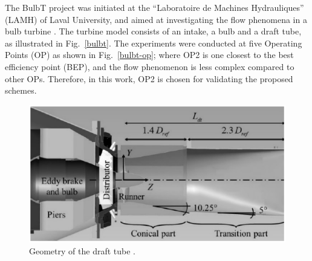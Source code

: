 The BulbT project was initiated at the ``Laboratoire de Machines Hydrauliques'' (LAMH) of Laval University, and aimed at investigating the flow phenomena in a bulb turbine \cite{vu2014cfd}. The turbine model consists of an intake, a bulb and a draft tube, as illustrated in Fig.~\ref{bulbt}. The experiments were conducted at five Operating Points (OP) as shown in Fig.~\ref{bulbt-op}; where OP2 is one closest to the best efficiency point (BEP), and the flow phenomenon is less complex compared to other OPs. Therefore, in this work, OP2 is chosen for validating the proposed schemes.
\begin{figure}[t]  
\centering
     \includegraphics[clip=true, trim= 0.0cm 0.0cm 0.0cm 0.0cm,width=0.99\linewidth]{./figures/bulbt/drafttube}                            
     \caption{Geometry of the draft tube \cite{pereira2017flow}.}
     \label{drafttube}
\end{figure}

